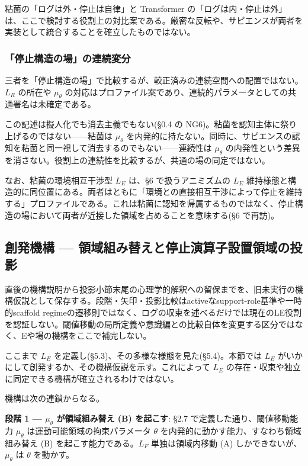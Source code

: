 粘菌の「ログは外・停止は自律」と Transformer の「ログは内・停止は外」は、ここで検討する役割上の対比案である。厳密な反転や、サピエンスが両者を実装として統合することを確立したものではない。

\subsubsection{「停止構造の場」の連続変分}


三者を「停止構造の場」で比較するが、較正済みの連続空間への配置ではない。$L_R$ の所在や $\mu_\theta$ の対応はプロファイル案であり、連続的パラメータとしての共通署名は未確定である。

この記述は擬人化でも消去主義でもない(\S{}0.4 の NG6)。粘菌を認知主体に祭り上げるのではない——粘菌は $\mu_\theta$ を内発的に持たない。同時に、サピエンスの認知を粘菌と同一視して消去するのでもない——連続性は $\mu_\theta$ の内発性という差異を消さない。役割上の連続性を比較するが、共通の場の同定ではない。

なお、粘菌の環境相互干渉型 $L_E$ は、\S{}6 で扱うアニミズムの $L_E$ 維持様態と構造的に同位置にある。両者はともに「環境との直接相互干渉によって停止を維持する」プロファイルである。これは粘菌に認知を帰属するものではなく、停止構造の場において両者が近接した領域を占めることを意味する(\S{}6 で再訪)。

\bigskip


\subsection{創発機構 — 領域組み替えと停止演算子設置領域の投影}


直後の機構説明から投影小節末尾の心理学的解釈への留保までを、旧未実行の機構仮説として保存する。段階・矢印・投影比較はactiveなsupport-role基準や一時的scaffold regimeの遷移則ではなく、ログの収束を述べるだけでは現在のLE役割を認証しない。閾値移動の局所定義や意識編との比較自体を変更する区分ではなく、Eや場の機構をここで補完しない。

ここまで $L_E$ を定義し(\S{}5.3)、その多様な様態を見た(\S{}5.4)。本節では $L_E$ がいかにして創発するか、その機構仮説を示す。これによって $L_E$ の存在・収束や独立に同定できる機構が確立されるわけではない。

機構は次の連鎖からなる。

\textbf{段階 1 — $\mu_\theta$ が領域組み替え (B) を起こす}:
\S{}2.7 で定義した通り、閾値移動能力 $\mu_\theta$ は運動可能領域の拘束パラメータ $\theta$ を内発的に動かす能力、すなわち領域組み替え (B) を起こす能力である。$L_F$ 単独は領域内移動 (A) しかできないが、$\mu_\theta$ は $\theta$ を動かす。

